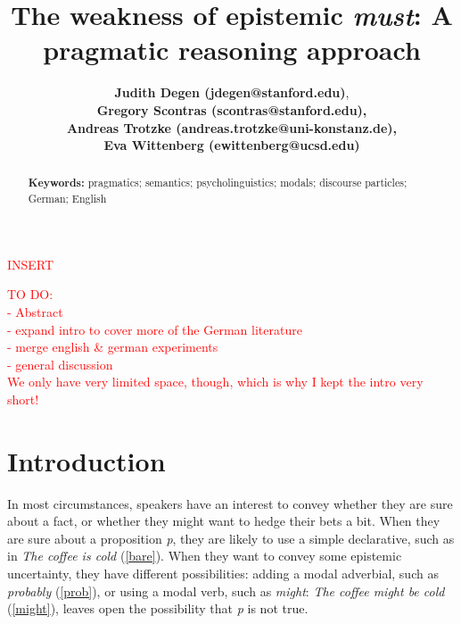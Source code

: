 \documentclass[11pt]{article}
\title{The weakness of epistemic \emph{must}: A pragmatic reasoning approach}
\author{{\large \bf Judith Degen (jdegen@stanford.edu)}, \\ {\large \bf Gregory Scontras (scontras@stanford.edu),}\\ {\large \bf Andreas Trotzke (andreas.trotzke@uni-konstanz.de),}\\ {\large \bf Eva Wittenberg (ewittenberg@ucsd.edu)}}
\newcommand{\red}[1]{\textcolor{Red}{#1}}
\begin{document}
\maketitle

\red{INSERT}

\begin{abstract}

	
\textbf{Keywords:} 
pragmatics; semantics; psycholinguistics; modals; discourse particles; German; English
\end{abstract}

\red{TO DO:\\
- Abstract\\
- expand intro to cover more of the German literature\\
- merge english \& german experiments\\
- general discussion\\
We only have very limited space, though, which is why I kept the intro very short!\\
}
\section{Introduction}

In most circumstances, speakers have an interest to convey whether they are sure about a fact, or whether they might want to hedge their bets a bit. When they are sure about a proposition \emph{p}, they are likely to use a simple declarative, such as in \emph{The coffee is cold} (\ref{bare}). When they want to convey some epistemic uncertainty, they have different possibilities: adding a modal adverbial, such as \emph{probably} (\ref{prob}), or using a modal verb, such as \emph{might}: \emph{The coffee might be cold} (\ref{might}), leaves open the possibility that \emph{p} is not true.
\end{document}

